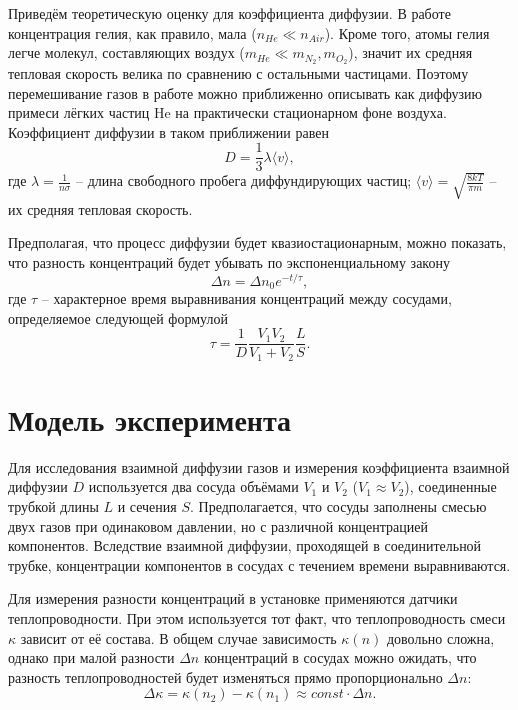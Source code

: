 \documentclass[a4paper, 10pt, twocolumn]{article}
\begin{document}
    Приведём теоретическую оценку для коэффициента диффузии. В работе концентрация гелия, как правило, мала ($n_{He} \ll n_{Air}$). Кроме того, атомы гелия легче молекул, составляющих воздух ($m_{He} \ll m_{N_2}, m_{O_2}$), значит их средняя тепловая скорость велика по сравнению с остальными частицами. Поэтому перемешивание газов в работе можно приближенно описывать как диффузию примеси лёгких частиц He на практически стационарном фоне воздуха. Коэффициент диффузии в таком приближении равен
    \begin{equation}
        \label{D}
        D = \frac{1}{3} \lambda \langle v \rangle,
    \end{equation}
    где $\lambda = \frac{1}{n\sigma}$ -- длина свободного пробега диффундирующих частиц; $\langle v \rangle = \sqrt{\frac{8kT}{\pi m}}$ -- их средняя тепловая скорость.

    Предполагая, что процесс диффузии будет квазиостационарным, можно показать, что разность концентраций будет убывать по экспоненциальному закону
    \begin{equation}
        \label{Delta_n}
        \Delta n = \Delta n_0 e^{-t / \tau},
    \end{equation}
    где $\tau$ -- характерное время выравнивания концентраций между сосудами, определяемое следующей формулой
    \begin{equation}
        \label{Tau}
        \tau = \frac{1}{D} \frac{V_1V_2}{V_1 + V_2} \frac{L}{S}.
    \end{equation}

\section{Модель эксперимента}
    Для   исследования   взаимной диффузии газов и измерения коэффициента взаимной диффузии  $D$  используется  два сосуда  объёмами  $V_1$ и $V_2$ ($V_1 \approx V_2$), соединенные трубкой длины $L$ и сечения  $S$. Предполагается, что сосуды заполнены смесью двух газов при одинаковом давлении, но с различной концентрацией компонентов. Вследствие взаимной диффузии, проходящей в   соединительной трубке, концентрации компонентов в сосудах с течением времени выравниваются.

    Для измерения разности  концентраций  в установке применяются датчики теплопроводности. При этом используется тот факт, что теплопроводность смеси $\kappa$ зависит от её состава. В общем случае   зависимость  $\kappa (n)$  довольно   сложна,   однако   при   малой   разности  $\Delta n$ концентраций в сосудах можно ожидать, что разность теплопроводностей будет изменяться прямо пропорционально $\Delta n:$
    \begin{equation*}
        \Delta \kappa = \kappa (n_2) - \kappa (n_1) \approx const \cdot \Delta n.
    \end{equation*}
\end{document}
